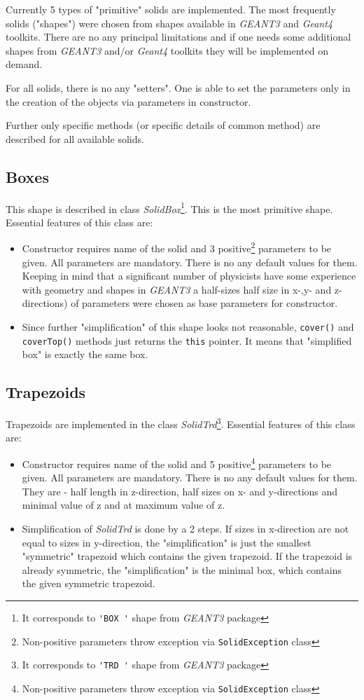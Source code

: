   Currently 5 types of "primitive" solids are implemented.  The most frequently solids ("shapes")
were chosen from shapes available in { \it GEANT3 } and {\it Geant4 } toolkits. 
There are no any principal limitations and if one needs some additional shapes from 
{\it GEANT3} and/or {\it Geant4} toolkits they will be implemented  on demand. 

For all solids, there is no any "setters". One is able to set the parameters only 
in the creation of the objects via parameters in constructor. 

Further only specific methods (or specific details of common method) are described for 
all available solids. 
 
   \subsection{ Boxes            } 
   This shape  is described in class 
{\it SolidBox}\footnote{ It corresponds to \verb+'BOX '+ shape from {\it GEANT3} package}. 
   This is the most primitive shape.
   Essential features of this class are:
   \begin{itemize} 
   \item  
   Constructor requires name of the solid and 3 positive\footnote{Non-positive parameters throw exception via 
\verb+SolidException+ class} parameters to be given. 
All parameters are mandatory.  There is no any default values for them. 
Keeping in mind that a significant number of physicists have some experience with 
geometry and shapes in {\it GEANT3} a half-sizes  half size in x-,y- and z- directions) 
of parameters were chosen as base parameters for constructor. 
   \item 
Since further "simplification" of this shape  looks not reasonable, 
\verb+cover()+ and \verb+coverTop()+ methods just returns the \verb+this+ pointer. 
It means that "simplified box" is exactly the same box. 
\end{itemize} 
   
   \subsection{ Trapezoids       } 
Trapezoids are implemented in the class 
{\it SolidTrd}\footnote{ It corresponds to \verb+'TRD '+ shape from {\it GEANT3} package}. 
Essential features of this class are: 
\begin{itemize}
\item 
   Constructor requires name of the solid and 5 positive\footnote{Non-positive parameters throw exception via 
\verb+SolidException+ class} parameters to be given. 
All parameters are mandatory.  There is no any default values for them. 
They are - half length in z-direction, half sizes on x- and y-directions
and minimal value of z and at maximum value of z.
   \item 
Simplification of {\it SolidTrd } is done by a 2 steps. 
If sizes in x-direction are not equal to sizes in y-direction, the "simplification" 
is just the smallest "symmetric" trapezoid which contains the given trapezoid. 
If the trapezoid is already symmetric, the "simplification" is the minimal box, which 
contains the given symmetric trapezoid. 
\end{itemize} 

